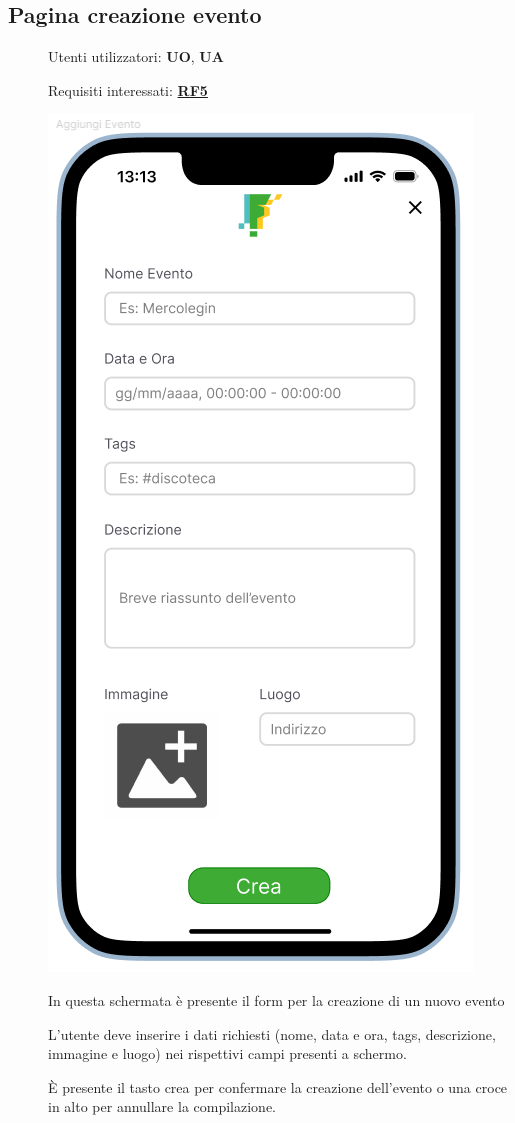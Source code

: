 \documentclass{article}
\begin{document}
\subsection{Pagina creazione evento}
\begin{description}
    \item[] Utenti utilizzatori: \textbf{UO}, \textbf{UA}
    \item[] Requisiti interessati: \hyperref[rf_5]{\textbf{RF5}}
    \item[] \begin{center}
              \includegraphics[scale=0.6]{Aggiungi_Evento.png}
          \end{center}
    \item[] In questa schermata è presente il form per la creazione di un nuovo evento
    \item[] L'utente deve inserire i dati richiesti (nome, data e ora, tags, descrizione, immagine e luogo) nei rispettivi campi presenti a schermo.
    \item[] È presente il tasto crea per confermare la creazione dell'evento o una croce in alto per annullare la compilazione.
\end{description}
\clearpage
\end{document}
